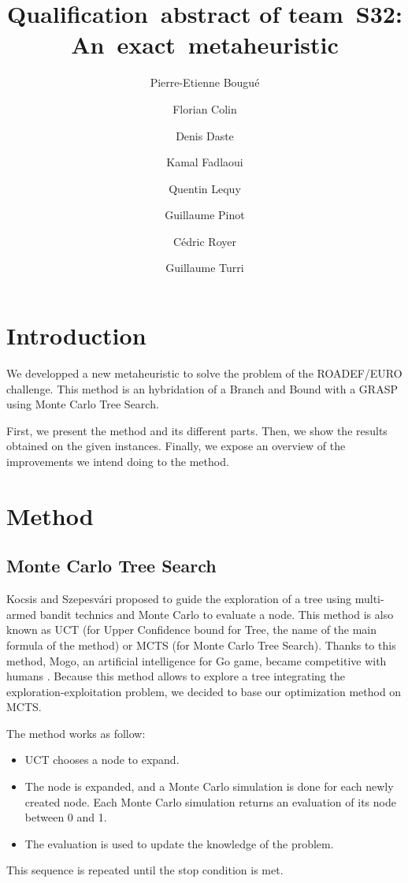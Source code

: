 \documentclass[a4paper,twocolumn]{article}
\title{Qualification~abstract of team~S32:
  An~exact~metaheuristic}
\author{Pierre-Etienne Bougué \and Florian Colin \and Denis Daste
  \and Kamal Fadlaoui \and Quentin Lequy \and Guillaume Pinot \and
  Cédric Royer \and Guillaume Turri}
\begin{document}
\maketitle

\section{Introduction}

We developped a new metaheuristic to solve the problem of the
ROADEF/EURO challenge.  This method is an hybridation
of a Branch and Bound with a GRASP using Monte Carlo Tree Search.

First, we present the method and its different parts.  Then, we show
the results obtained on the given instances.  Finally, we expose an overview of
the improvements we intend doing to the method.

\section{Method}

\subsection{Monte Carlo Tree Search}

Kocsis and Szepesv\'ari\cite{kocsis2006bandit} proposed to guide the exploration of a tree
using multi-armed bandit technics and Monte Carlo to evaluate
a node.  This method is also known as UCT (for Upper Confidence bound
for Tree, the name of the main formula of the method) or MCTS (for
Monte Carlo Tree Search).  Thanks to this method, Mogo, an
artificial intelligence for Go game, became competitive with humans
\cite{gelly2007contribution}.  Because this method allows to explore a
tree integrating the exploration-exploitation problem, we decided to
base our optimization method on MCTS.

The method works as follow:
\begin{itemize}
\item UCT chooses a node to expand.
\item The node is expanded, and a Monte Carlo simulation is done for
  each newly created node. Each Monte Carlo simulation returns an
  evaluation of its node between 0 and 1.
\item The evaluation is used to update the
  knowledge of the problem.
\end{itemize}
This sequence is repeated until the stop condition is met.
\end{document}
